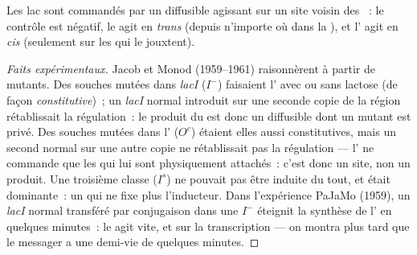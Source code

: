 \begin{proposition}\label{prop:b1:expression-control:jacobmonod}
Les  lac sont commandés par un  diffusible agissant sur
un site voisin des ~: le contrôle est négatif, le  agit
en \emph{trans} (depuis n'importe où dans la ), et l'
agit en \emph{cis} (seulement sur les  qui le jouxtent).
\end{proposition}
\begin{proof}[Faits expérimentaux]
Jacob et Monod (1959--1961) raisonnèrent à partir de mutants. Des
souches mutées dans \emph{lacI} ($I^-$) faisaient l' avec ou sans
lactose (de façon \emph{constitutive})~; un  \emph{lacI} normal
introduit sur une seconde copie de la région rétablissait la
régulation~: le produit du  est donc un  diffusible dont
un mutant est privé. Des souches mutées dans l' ($O^c$) étaient
elles aussi constitutives, mais un second  normal sur une autre
copie ne rétablissait pas la régulation --- l' ne commande que
les  qui lui sont physiquement attachés~: c'est donc un site, non
un produit. Une troisième classe ($I^s$) ne pouvait pas être induite du
tout, et était dominante~: un  qui ne fixe plus l'inducteur.
Dans l'expérience PaJaMo (1959), un  \emph{lacI} normal transféré
par conjugaison dans une  $I^-$ éteignit la synthèse de l'
en quelques minutes~: le  agit vite, et sur la transcription
--- on montra plus tard que le messager a une demi-vie de quelques
minutes.
\end{proof}


